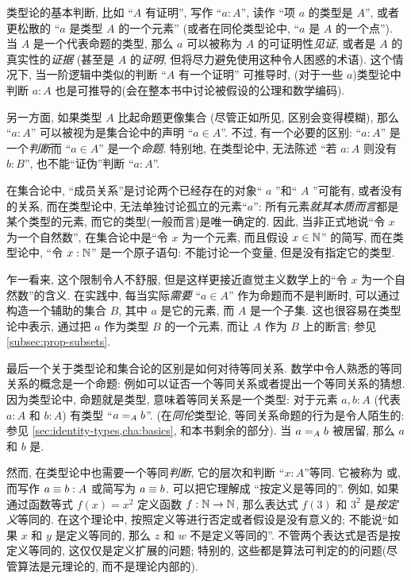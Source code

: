 类型论的基本判断, 比如 ``$A$ 有证明'', 写作 ``$a:A$'', 读作 ``项 $a$ 的类型是 $A$'', 或者更松散的 ``$a$ 是类型 $A$ 的一个元素'' (或者在同伦类型论中, ``$a$ 是 $A$ 的一个点'').
%
%
%
当 $A$ 是一个代表命题的类型, 那么 $a$ 可以被称为 $A$ 的可证明性\emph{见证}, 或者是 $A$ 的真实性的\emph{证据} (甚至是 $A$ 的\emph{证明}, 但将尽力避免使用这种令人困惑的术语).
这个情况下, 当一阶逻辑中类似的判断 ``$A$ 有一个证明'' 可推导时, (对于一些 $a$)类型论中判断 $a:A$ 也是可推导的(会在整本书中讨论被假设的公理和数学编码).

另一方面, 如果类型 $A$ 比起命题更像集合 (尽管正如所见, 区别会变得模糊), 那么 ``$a:A$'' 可以被视为是集合论中的声明 ``$a\in A$''.
不过, 有一个必要的区别: ``$a:A$'' 是一个\emph{判断}而 ``$a\in A$'' 是一个\emph{命题}.
特别地, 在类型论中, 无法陈述 ``若 $a:A$ 则没有 $b:B$'', 也不能``证伪''判断 ``$a:A$''.

在集合论中, ``成员关系''是讨论两个已经存在的对象`` $a$ ''和`` $A$ ''可能有, 或者没有的关系, 而在类型论中, 无法单独讨论孤立的元素``$a$'': 所有元素\emph{就其本质而言}都是某个类型的元素, 而它的类型(一般而言)是唯一确定的.
因此, 当非正式地说``令 $x$ 为一个自然数'', 在集合论中是``令 $x$ 为一个元素, 而且假设 $x\in\nat$'' 的简写, 而在类型论中, ``令 $x:\nat$'' 是一个原子语句: 不能讨论一个变量, 但是没有指定它的类型.
%

乍一看来, 这个限制令人不舒服, 但是这样更接近直觉主义数学上的``令 $x$ 为一个自然数''的含义.
在实践中, 每当实际\emph{需要} ``$a\in A$'' 作为命题而不是判断时, 可以通过构造一个辅助的集合 $B$, 其中 $a$ 是它的元素, 而 $A$ 是一个子集.
这也很容易在类型论中表示, 通过把 $a$ 作为类型 $B$ 的一个元素, 而让 $A$ 作为 $B$ 上的断言;
参见\cref{subsec:prop-subsets}.

最后一个关于类型论和集合论的区别是如何对待等同关系.
数学中令人熟悉的等同关系的概念是一个命题: 例如可以证否一个等同关系或者提出一个等同关系的猜想.
因为类型论中, 命题就是类型, 意味着等同关系是一个类型: 对于元素 $a,b:A$ (代表 $a:A$ 和 $b:A$) 有类型 ``$\id[A]ab$''.
(在\emph{同伦}类型论, 等同关系命题的行为是令人陌生的: 参见 \cref{sec:identity-types,cha:basics}, 和本书剩余的部分).
当 $\id[A]ab$ 被居留, 那么 $a$ 和 $b$ 是. %
%

然而, 在类型论中也需要一个等同\emph{判断}, 它的层次和判断 ``$x:A$''等同.
%
%
它被称为%
%
%
或,
%
%
而写作 $a\jdeq b : A$ 或简写为 $a \jdeq b$.
可以把它理解成 ``按定义是等同的''.
例如, 如果通过函数等式 $f(x)=x^2$ 定义函数 $f:\nat\to\nat$, 那么表达式 $f(3)$ 和 $3^2$ 是\emph{按定义}等同的.
在这个理论中, 按照定义等进行否定或者假设是没有意义的;
不能说``如果 $x$ 和 $y$ 是定义等同的, 那么 $z$ 和 $w$ 不是定义等同的''.
不管两个表达式是否是按定义等同的, 这仅仅是定义扩展的问题;
特别的, 这些都是算法可判定的的问题(尽管算法是元理论的, 而不是理论内部的).
%


